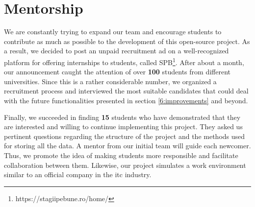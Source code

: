 \section{Mentorship} \label{6:mentorship}

    We are constantly trying to expand our team and encourage students to contribute as much as possible to the development of this open-source project. As a result, we decided to post an unpaid recruitment ad on a well-recognized platform for offering internships to students, called SPB\footnote{https://stagiipebune.ro/home/}. After about a month, our announcement caught the attention of over \textbf{100} students from different universities. Since this is a rather considerable number, we organized a recruitment process and interviewed the most suitable candidates that could deal with the future functionalities presented in section \ref{6:improvements} and beyond.
    
    Finally, we succeeded in finding \textbf{15} students who have demonstrated that they are interested and willing to continue implementing this project. They asked us pertinent questions regarding the structure of the project and the methods used for storing all the data. A mentor from our initial team will guide each newcomer. Thus, we promote the idea of making students more responsible and facilitate collaboration between them. Likewise, our project simulates a work environment similar to an official company in the \acrshort{itc} industry.
